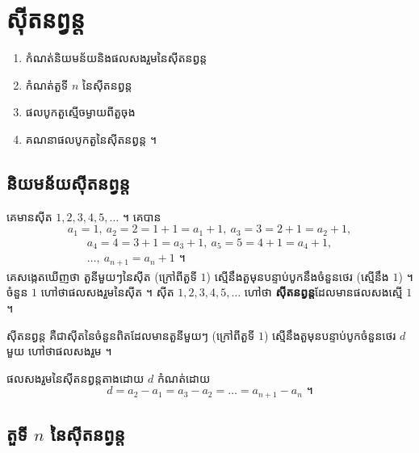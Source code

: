 \chapter{ស៊ីតនព្វន្ត}

\begin{objBox}[វត្ថុបំណង]
\begin{enumerate}[1]
  \item កំណត់និយមន័យនិងផលសងរួមនៃស៊ីតនព្វន្ត
  \item កំណត់តួទី $n$ នៃស៊ីតនព្វន្ត
  \item ផលបូកតួស្មើចម្ងាយពីតួចុង
  \item គណនាផលបូកតួនៃស៊ីតនព្វន្ត ។
\end{enumerate}
\end{objBox}

\section{និយមន័យស៊ីតនព្វន្ត}

\begin{example}[ឧទាហរណ៍]
គេមានស៊ីត $1, 2, 3, 4, 5, \ldots$ ។ គេបាន
\[
a_1 = 1,\ a_2 = 2 = 1 + 1 = a_1 + 1,\ a_3 = 3 = 2 + 1 = a_2 + 1,
\]
\[
\begin{gathered} a_4 = 4 = 3 + 1 = a_3 + 1,\ a_5 = 5 = 4 + 1 = a_4 + 1,\\ \ldots,\ a_{n+1} = a_n + 1 \text{ ។} \end{gathered}
\]
គេសង្កេតឃើញថា តួនីមួយៗនៃស៊ីត (ក្រៅពីតួទី $1$) ស្មើនឹងតួមុនបន្ទាប់បូកនឹងចំនួនថេរ (ស្មើនឹង $1$) ។ ចំនួន $1$ ហៅថាផលសងរួមនៃស៊ីត ។ ស៊ីត $1, 2, 3, 4, 5, \ldots$ ហៅថា \textbf{ស៊ីតនព្វន្ត}ដែលមានផលសងស្មើ $1$ ។
\end{example}

\begin{definition}
ស៊ីតនព្វន្ត គឺជាស៊ីតនៃចំនួនពិតដែលមានតួនីមួយៗ (ក្រៅពីតួទី $1$) ស្មើនឹងតួមុនបន្ទាប់បូកចំនួនថេរ $d$ មួយ ហៅថាផលសងរួម ។
\end{definition}

\begin{formulaBox}[ជាទូទៅ]
ផលសងរួមនៃស៊ីតនព្វន្តតាងដោយ $d$ កំណត់ដោយ
\[
d = a_2 - a_1 = a_3 - a_2 = \ldots = a_{n+1} - a_n \text{ ។}
\]
\end{formulaBox}

\section{តួទី \texorpdfstring{$n$}{n} នៃស៊ីតនព្វន្ត}

